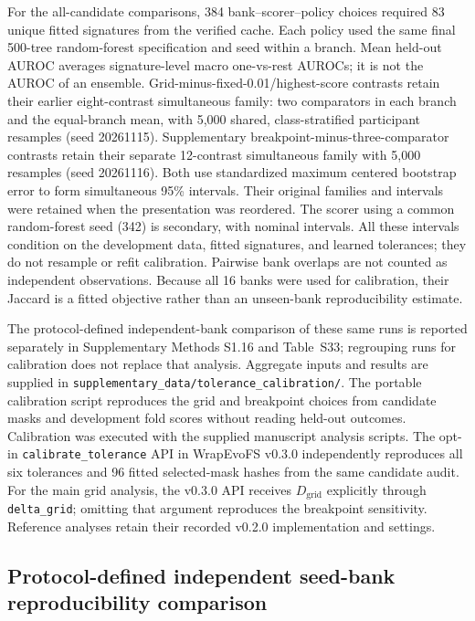 For the all-candidate comparisons, 384 bank--scorer--policy choices required 83 unique fitted signatures from the verified cache. Each policy used the same final 500-tree random-forest specification and seed within a branch. Mean held-out AUROC averages signature-level macro one-vs-rest AUROCs; it is not the AUROC of an ensemble. Grid-minus-fixed-0.01/highest-score contrasts retain their earlier eight-contrast simultaneous family: two comparators in each branch and the equal-branch mean, with 5,000 shared, class-stratified participant resamples (seed 20261115). Supplementary breakpoint-minus-three-comparator contrasts retain their separate 12-contrast simultaneous family with 5,000 resamples (seed 20261116). Both use standardized maximum centered bootstrap error to form simultaneous 95\% intervals. Their original families and intervals were retained when the presentation was reordered. The scorer using a common random-forest seed (342) is secondary, with nominal intervals. All these intervals condition on the development data, fitted signatures, and learned tolerances; they do not resample or refit calibration. Pairwise bank overlaps are not counted as independent observations. Because all 16 banks were used for calibration, their Jaccard is a fitted objective rather than an unseen-bank reproducibility estimate.

The protocol-defined independent-bank comparison of these same runs is reported separately in Supplementary Methods S1.16 and Table~S33; regrouping runs for calibration does not replace that analysis. Aggregate inputs and results are supplied in \texttt{supplementary\_data/tolerance\_calibration/}. The portable calibration script reproduces the grid and breakpoint choices from candidate masks and development fold scores without reading held-out outcomes. Calibration was executed with the supplied manuscript analysis scripts. The opt-in \texttt{calibrate\_tolerance} API in WrapEvoFS v0.3.0 independently reproduces all six tolerances and 96 fitted selected-mask hashes from the same candidate audit. For the main grid analysis, the v0.3.0 API receives $D_{\mathrm{grid}}$ explicitly through \texttt{delta\_grid}; omitting that argument reproduces the breakpoint sensitivity. Reference analyses retain their recorded v0.2.0 implementation and settings.


\subsection{Protocol-defined independent seed-bank reproducibility comparison}
\label{sec:supp-seed-banks}

